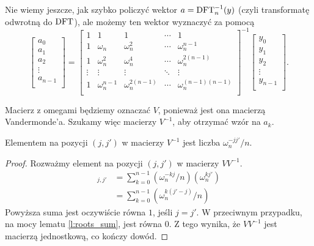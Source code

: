\documentclass[11pt]{scrartcl}
\begin{document}
    Nie wiemy jeszcze, jak szybko policzyć wektor $a = \operatorname{DFT}_n^{-1}(y)$ (czyli transformatę odwrotną do $\operatorname{DFT}$), ale możemy ten wektor wyznaczyć za pomocą
    \begin{equation*}
        \begin{bmatrix}
            a_0 \\
            a_1 \\
            a_2 \\
            \vdots \\
            a_{n-1} \\
        \end{bmatrix}
        =
        \begin{bmatrix}
            1 & 1 & 1 & \cdots & 1 \\
            1 & \omega_n & \omega_n^2 & \cdots & \omega_n^{n-1} \\
            1 & \omega_n^2 & \omega_n^4  & \cdots & \omega_n^{2(n-1)} \\
            \vdots & \vdots  & \vdots & \ddots & \vdots    \\
            1 & \omega_n^{n-1} & \omega_n^{2(n-1)}  & \cdots & \omega_n^{(n-1)(n-1)} \\
        \end{bmatrix}^{-1}
        \begin{bmatrix}
            y_0 \\
            y_1 \\
            y_2 \\
            \vdots \\
            y_{n-1} \\
        \end{bmatrix}.
    \end{equation*}

    Macierz z omegami będziemy oznaczać $V$, ponieważ jest ona macierzą Vandermonde'a. Szukamy więc macierzy $V^{-1}$, aby otrzymać wzór na $a_k$.

    \begin{lemma}
        Elementem na pozycji $(j, j')$ w macierzy $V^{-1}$ jest liczba $\omega_n^{-jj'}/n$.
    \end{lemma}
    \begin{proof}
        Rozważmy element na pozycji $(j, j')$ w macierzy $VV^{-1}$.
        \begin{align*}
            [VV^{-1}]_{j,j'} &= \sum_{k = 0}^{n-1}(\omega_n^{-kj}/n)(\omega_n^{kj'}) \\
                             &= \sum_{k = 0}^{n-1}(\omega_n^{k(j'-j)}/n)
        \end{align*}
        Powyższa suma jest oczywiście równa $1$, jeśli $j = j'$. W przeciwnym przypadku, na mocy lematu \ref{l:roots_sum}, jest równa $0$. Z tego wynika, że $VV^{-1}$ jest macierzą jednostkową, co kończy dowód.
    \end{proof}
\end{document}
